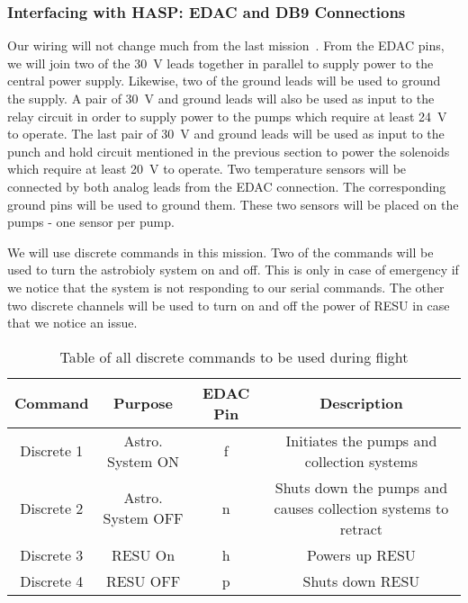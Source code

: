 \subsubsection{Interfacing with HASP: EDAC and DB9 Connections}

Our wiring will not change much from the last mission~\cite{SORA}.  From the EDAC pins, we will join two of the \SI{30}{\volt} leads together in parallel to supply power to the central power supply.  Likewise, two of the ground leads will be used to ground the supply.  A pair of \SI{30}{\volt} and ground leads will also be used as input to the relay circuit in order to supply power to the pumps which require at least \SI{24}{\volt} to operate.  The last pair of \SI{30}{\volt} and ground leads will be used as input to the punch and hold circuit mentioned in the previous section to power the solenoids which require at least \SI{20}{\volt} to operate.  Two temperature sensors will be connected by both analog leads from the EDAC connection.  The corresponding ground pins will be used to ground them.  These two sensors will be placed on the pumps - one sensor per pump.  

We will use discrete commands in this mission.  Two of the commands will be used to turn the astrobioly system on and off.  This is only in case of emergency if we notice that the system is not responding to our serial commands.  The other two discrete channels will be used to turn on and off the power of RESU in case that we notice an issue.

\begin{table}[!ht]
\centering
\caption{Table of all discrete commands to be used during flight} 
\label{tab:Dis-Commands}
\bigskip
\begin{tabular}{|c|c|c|c|}
\hline
\multicolumn{1}{|c|}{\bfseries Command} & \multicolumn{1}{c|}{\bfseries Purpose} &  \multicolumn{1}{c|}{\bfseries EDAC Pin} & \multicolumn{1}{c|}{\bfseries Description} \\
\hline
    Discrete 1     	& Astro. System ON 	& f	 & Initiates the pumps and collection systems   \\ \hline 
    Discrete 2    	& Astro. System OFF 	& n	 &  Shuts down the pumps and causes collection systems to retract  \\ \hline
    Discrete 3  	& RESU On 	& h	 & Powers up RESU   \\ \hline 
    Discrete 4 		& RESU OFF 	& p	 & Shuts down RESU   \\ \hline
\end{tabular}
\medskip
\end{table}




